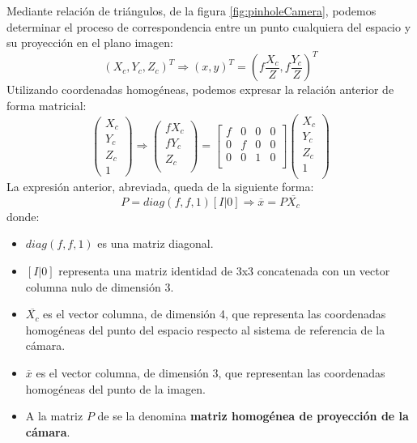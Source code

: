 Mediante relación de triángulos, de la figura \ref{fig:pinholeCamera}, podemos determinar el proceso de correspondencia entre un punto cualquiera del espacio y su proyección en el plano imagen:
\begin{equation}
  (X_c , Y_c , Z_c )^T \Longrightarrow  (x, y)^T = (f \dfrac{X_c}{Z}, f \dfrac{Y_c}{Z})^T
\end{equation}
Utilizando coordenadas homogéneas, podemos expresar la relación anterior de forma matricial:
\begin{equation}
  \begin{pmatrix}
    X_{c} \\
    Y_{c} \\
    Z_{c} \\
    1
  \end{pmatrix}
  \Longrightarrow
  \begin{pmatrix}
    fX_{c} \\
    fY_{c} \\
    Z_{c} \\
  \end{pmatrix}
  =
  \begin{bmatrix} f & 0 & 0 & 0 \\ 0 & f & 0 & 0 \\ 0 & 0 & 1 & 0 \\\end{bmatrix}
  \begin{pmatrix} X_{c} \\  Y_{c} \\  Z_{c} \\  1 \\\end{pmatrix}
\end{equation}
La expresión anterior, abreviada, queda de la siguiente forma:
\begin{equation}
  P = diag(f, f, 1) [I|0] \Longrightarrow  \overline{x} = P\overline{X_c}
\end{equation}
donde:
\begin{itemize}
\item $diag(f, f, 1)$ es una matriz diagonal.
\item $[I|0]$ representa una matriz identidad de 3x3 concatenada con un vector columna nulo de dimensión 3.
\item $\overline{X_c}$  es el vector columna, de dimensión 4, que representa las coordenadas homogéneas del punto del espacio respecto al sistema de referencia de la cámara.
\item $\overline{x}$  es el vector columna, de dimensión 3, que representan las coordenadas homogéneas del punto de la imagen.
\item A la matriz $P$ de se la denomina \textbf{matriz homogénea de proyección de la cámara}.
\end{itemize}

